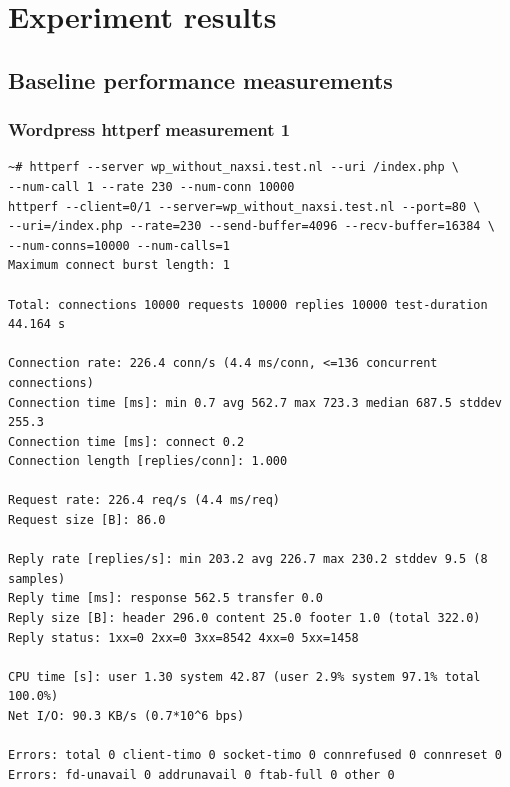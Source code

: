 \documentclass[Measurement results]{subfiles}
\begin{document}
\newpage
\section{Experiment results}
\label{sec:Measurement results}

\subsection{Baseline performance measurements}

\subsubsection{Wordpress httperf measurement 1}
\label{sec:baseline_measurement_1}
\begin{verbatim}
~# httperf --server wp_without_naxsi.test.nl --uri /index.php \
--num-call 1 --rate 230 --num-conn 10000
httperf --client=0/1 --server=wp_without_naxsi.test.nl --port=80 \
--uri=/index.php --rate=230 --send-buffer=4096 --recv-buffer=16384 \
--num-conns=10000 --num-calls=1
Maximum connect burst length: 1

Total: connections 10000 requests 10000 replies 10000 test-duration 44.164 s

Connection rate: 226.4 conn/s (4.4 ms/conn, <=136 concurrent connections)
Connection time [ms]: min 0.7 avg 562.7 max 723.3 median 687.5 stddev 255.3
Connection time [ms]: connect 0.2
Connection length [replies/conn]: 1.000

Request rate: 226.4 req/s (4.4 ms/req)
Request size [B]: 86.0

Reply rate [replies/s]: min 203.2 avg 226.7 max 230.2 stddev 9.5 (8 samples)
Reply time [ms]: response 562.5 transfer 0.0
Reply size [B]: header 296.0 content 25.0 footer 1.0 (total 322.0)
Reply status: 1xx=0 2xx=0 3xx=8542 4xx=0 5xx=1458

CPU time [s]: user 1.30 system 42.87 (user 2.9% system 97.1% total 100.0%)
Net I/O: 90.3 KB/s (0.7*10^6 bps)

Errors: total 0 client-timo 0 socket-timo 0 connrefused 0 connreset 0
Errors: fd-unavail 0 addrunavail 0 ftab-full 0 other 0
\end{verbatim}

\newpage
\end{document}
